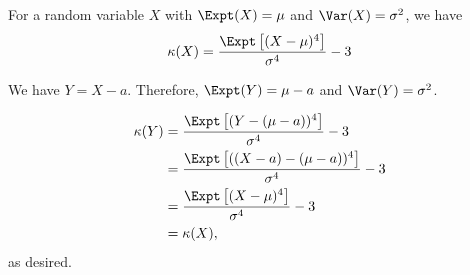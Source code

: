 \Question{\currfilebase}

For a random variable \(X\) with \(\Expt(X) = \mu\) and \(\Var(X) = \sigma^2\), we have
\[
    \kappa(X) = \frac{\Expt\left[(X - \mu)^4\right]}{\sigma^4} - 3
\]

We have \(Y = X - a\). Therefore, \(\Expt(Y) = \mu - a\) and \(\Var(Y) = \sigma^2\).

\begin{align*}
    \kappa(Y) & = \frac{\Expt\left[(Y - (\mu - a))^4\right]}{\sigma^4} - 3       \\
              & = \frac{\Expt\left[((X - a) - (\mu - a))^4\right]}{\sigma^4} - 3 \\
              & = \frac{\Expt\left[(X - \mu)^4\right]}{\sigma^4} - 3             \\
              & = \kappa(X),
\end{align*}
as desired.

